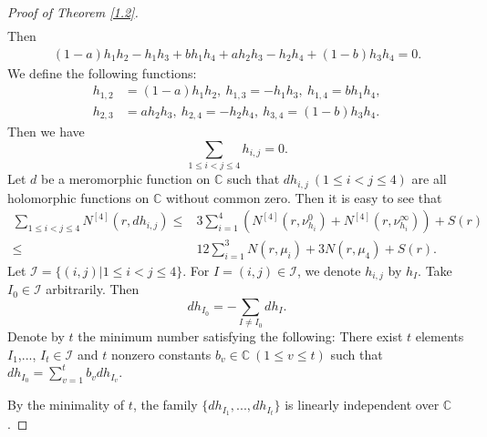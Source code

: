 \documentclass[12pt,leqno]{amsart}
\newcommand{\C}{{\mathbb{C}}}
\numberwithin{equation}{section}
\begin{document}
\begin{proof}[Proof of Theorem \ref{1.2}]
\begin{align*}
\end{align*}
Then
\begin{align*}
(1-a)h_1h_2-h_1h_3+bh_1h_4+a h_2h_3-h_2h_4+(1-b) h_3h_4=0.
\end{align*}
We define the following functions:
\begin{align*}
h_{1,2}&=(1-a)h_1h_2,\ h_{1,3}=-h_1h_3,\ h_{1,4}=b h_1h_4,\\
h_{2,3}&=a h_2h_3,\ h_{2,4}=-h_2h_4,\ h_{3,4}=(1-b) h_3h_4.
\end{align*}
Then we have 
$$ \sum_{1\le i<j\le 4}h_{i,j}=0. $$
Let $d$ be a meromorphic function on $\C$ such that $dh_{i,j}\ (1\le i<j\le 4)$ are all holomorphic functions on $\C$ without common zero. Then it is easy to see that
\begin{align*}
 \sum_{1\le i<j\le 4}N^{[4]}(r,dh_{i,j})\le& 3\sum_{i=1}^4(N^{[4]}(r,\nu^0_{h_i})+N^{[4]}(r,\nu^\infty_{h_i}))+S(r)\\ 
\le& 12\sum_{i=1}^3N(r,\mu_i)+3N(r,\mu_4)+S(r).
\end{align*}
Let $\mathcal I=\{(i,j)|1\le i<j\le 4\}$. For $I=(i,j)\in\mathcal I$, we denote $h_{i,j}$ by $h_{I}$.
Take $I_0\in\mathcal I$ arbitrarily. Then 
$$dh_{I_0}=-\sum_{I\ne I_0}dh_I.$$
Denote by $t$ the minimum number satisfying the following: There exist $t$ elements $I_1$,..., $I_t \in\mathcal I$ and $t$ nonzero constants $b_v\in\C\ (1\le v\le t)$ such that $dh_{I_0}=\sum_{v=1}^tb_vdh_{I_v}.$

By the minimality of $t$, the family $\{dh_{I_1},...,dh_{I_t}\}$ is linearly independent over $\C$.


\end{proof}
\end{document}
